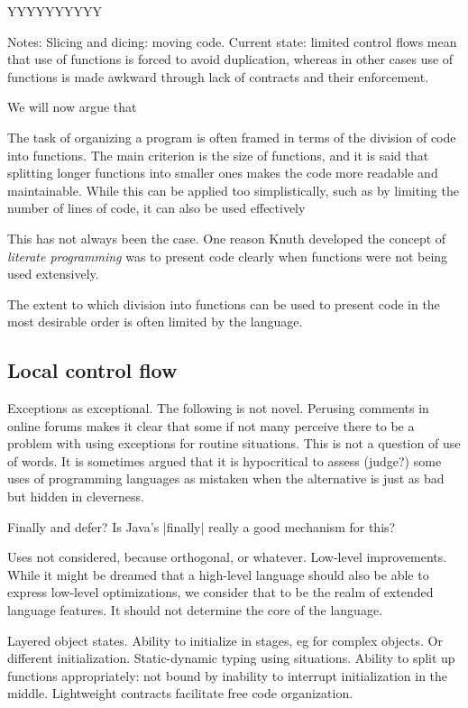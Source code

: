 \documentclass[10pt]{amsart}
\begin{document}
YYYYYYYYYY



Notes: Slicing and dicing: moving code.  Current state: limited
control flows mean that use of functions is forced to avoid
duplication, whereas in other cases use of functions is made awkward
through lack of contracts and their enforcement.



We will now argue that



  The task of organizing a
program is often framed in terms of the division of code into
functions.  The main criterion is the size of functions, and it is
said that splitting longer functions into smaller ones makes the code
more readable and maintainable.  While this can be applied too
simplistically, such as by limiting the number of lines of code, it
can also be used effectively

This has not always been the case.  One reason Knuth developed the
concept of \emph{literate programming} was to present code clearly
when functions were not being used extensively.

The extent to which division into functions can be used to present
code in the most desirable order is often limited by the language.


\subsection{Local control flow}

Exceptions as exceptional.  The following is not novel.  Perusing
comments in online forums makes it clear that some if not many
perceive there to be a problem with using exceptions for routine
situations.  This is not a question of use of words.  It is sometimes
argued that it is hypocritical to assess (judge?) some uses of
programming languages as mistaken when the alternative is just as bad
but hidden in cleverness.

Finally and defer?  Is Java's |finally| really a good mechanism for
this?

Uses not considered, because orthogonal, or whatever.  Low-level
improvements.  While it might be dreamed that a high-level language
should also be able to express low-level optimizations, we consider
that to be the realm of extended language features.  It should not
determine the core of the language.

Layered object states.  Ability to initialize in stages, eg for
complex objects.  Or different initialization.  Static-dynamic typing
using situations.  Ability to split up functions appropriately: not
bound by inability to interrupt initialization in the middle.
Lightweight contracts facilitate free code organization.
\end{document}
